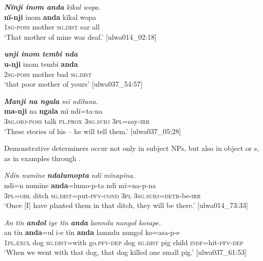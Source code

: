 \ea%
    \label{ex:det:91}
         \textit{\textbf{Nïnji inom anda} kïkal wopa.}\\
\gll    \textbf{nï-nji}    inom  \textbf{anda}    kïkal  wopa\\
    1\textsc{sg-poss}  mother  \textsc{sg.dist}  ear    all\\
\glt `That mother of mine was deaf.’ [ulwa014\_02:18]
\z

\ea%
    \label{ex:det:92}
          \textit{\textbf{unji inom tembi nda}}\\
\gll    \textbf{u-nji}    inom  tembi  \textbf{anda}\\
    2\textsc{sg-poss}  mother  bad    \textsc{sg.dist}\\
\glt `that poor mother of yours’ [ulwa037\_54:57]
\z

\ea%
    \label{ex:det:93}
         \textit{\textbf{Manji na ngala} mï ndïtana.}\\
\gll \textbf{ma-nji}      na    \textbf{ngala}    mï      ndï=ta-na\\
    3\textsc{sg.obj-poss}  talk  \textsc{pl.prox}  \textsc{3sg.subj}  3\textsc{pl}=say-\textsc{irr}\\
\glt `These stories of his -- he will tell them.’ [ulwa037\_05:28]
\z

Demonstrative determiners occur not only in subject NPs, but also in object or  s, as in examples  through .

\ea%
    \label{ex:det:94}
          \textit{Ndïn numïne} \textbf{\textit{ndalumopta}} \textit{ndï mïnapïna.}\\
\gll    ndï=n    numïne  \textbf{anda}=lumo-p-ta      ndï mï=na-p-na\\
    3\textsc{pl=obl}  ditch    \textsc{sg.dist}=put-\textsc{pfv-cond}  \textsc{3pl}    \textsc{3sg.subj=detr}{}-be-\textsc{irr}\\
\glt `Once [I] have planted them in that ditch, they will be there.’ [ulwa014\_73:33]
\z



\ea%
    \label{ex:det:95}
          \textit{An tïn} \textbf{\textit{andol}} \textit{iye tïn} \textbf{\textit{anda}} \textit{lamndu nungol kosape.}\\
\gll    an      tïn    \textbf{anda}=ul    i-e        tïn    \textbf{anda} lamndu  nungol  ko=asa-p-e\\
    1\textsc{pl.excl}  dog  \textsc{sg.dist=}with  go.\textsc{pfv-dep}  dog  \textsc{sg.dist}    pig      child  \textsc{indf}=hit-\textsc{pfv-dep}\\
\glt `When we went with that dog, that dog killed one small pig.’ [ulwa037\_61:53]
\z

